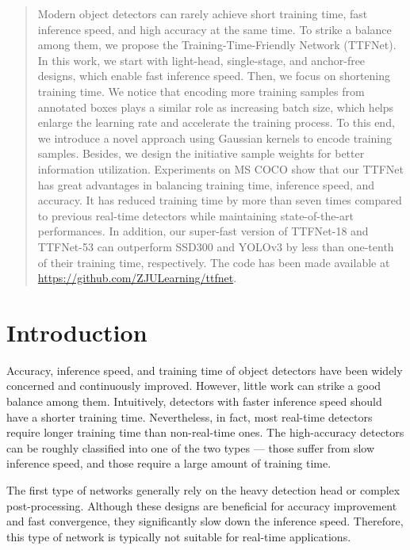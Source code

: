 \documentclass[letterpaper]{article} \usepackage{aaai20}  \usepackage{times}  \usepackage{helvet} \usepackage{courier}  \usepackage[hyphens]{url}  \usepackage{graphicx} \urlstyle{rm} \def\UrlFont{\rm}  \usepackage{graphicx}  \frenchspacing  \setlength{\pdfpagewidth}{8.5in}  \setlength{\pdfpageheight}{11in}  \usepackage{subcaption}
\author{
Zili Liu,\textsuperscript{\rm 1,2}
Tu Zheng,\textsuperscript{\rm 1,2}
Guodong Xu,\textsuperscript{\rm 1,2}
Zheng Yang,\textsuperscript{\rm 2}
Haifeng Liu,\textsuperscript{\rm 1}
Deng Cai\textsuperscript{\rm 1,2,3} \\ \textsuperscript{\rm 1}State Key Lab of CAD\&CG, Zhejiang University, Hangzhou, China \\ 
\textsuperscript{\rm 2}Fabu Inc., Hangzhou, China \\
\textsuperscript{\rm 3}Alibaba-Zhejiang University Joint Institute of Frontier Technologies, Hangzhou, China\\  \{zililiuzju, zhengtuzju\}@gmail.com \quad yangzheng@fabu.ai \quad \{memoiry, haifengliu, dcai\}@zju.edu.cn }
\begin{document}
\maketitle

\begin{abstract}
Modern object detectors can rarely achieve short training time, fast inference speed, and high accuracy at the same time. To strike a balance among them, we propose the Training-Time-Friendly Network (TTFNet). In this work, we start with light-head, single-stage, and anchor-free designs, which enable fast inference speed. Then, we focus on shortening training time. We notice that encoding more training samples from annotated boxes plays a similar role as increasing batch size, which helps enlarge the learning rate and accelerate the training process. To this end, we introduce a novel approach using Gaussian kernels to encode training samples. Besides, we design the initiative sample weights for better information utilization. Experiments on MS COCO show that our TTFNet has great advantages in balancing training time, inference speed, and accuracy. It has reduced training time by more than seven times compared to previous real-time detectors while maintaining state-of-the-art performances. In addition, our super-fast version of TTFNet-18 and TTFNet-53 can outperform SSD300 and YOLOv3 by less than one-tenth of their training time, respectively. The code has been made available at \url{https://github.com/ZJULearning/ttfnet}.
\end{abstract}

\section{Introduction}

Accuracy, inference speed, and training time of object detectors have been widely concerned and continuously improved. However, little work can strike a good balance among them. Intuitively, detectors with faster inference speed should have a shorter training time. Nevertheless, in fact, most real-time detectors require longer training time than non-real-time ones. The high-accuracy detectors can be roughly classified into one of the two types --- those suffer from slow inference speed, and those require a large amount of training time.

The first type of networks \cite{ren2015faster,lin2017focal,DBLP:journals/corr/abs-1904-01355} generally rely on the heavy detection head or complex post-processing. Although these designs are beneficial for accuracy improvement and fast convergence, they significantly slow down the inference speed. Therefore, this type of network is typically not suitable for real-time applications.
\end{document}
